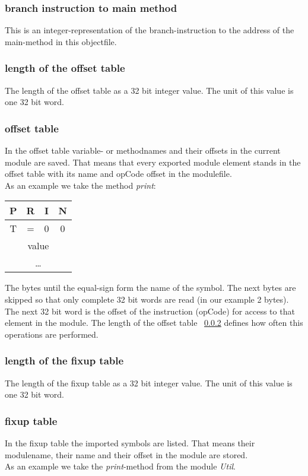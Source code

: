 \subsubsection{branch instruction to main method}
\label{branch_to_main}
This is an integer-representation of the branch-instruction to the address of
the main-method in this objectfile. 
\subsubsection{length of the offset table}
\label{length_offset_table}
The length of the offset table as a 32 bit integer value. The unit of this value
is one 32 bit word. 
\subsubsection{offset table}
\label{offset_table}
In the offset table variable- or methodnames and their offsets in the current
module are saved. That means that every exported module element stands in the
offset table with its name and opCode offset in the modulefile.  \\
As an example we take the method \emph{print}:

\begin{center}
	\begin{tabular}{|c|c|c|c|}
		\hline
		P &  R & I & N \\
		\hline
		T &  = &  0 & 0 \\
		\hline 
		\multicolumn{4}{|c|}{value} \\
		\hline
		\multicolumn{4}{|c|}{\ldots} \\
		\hline
	\end{tabular}
\end{center}

The bytes until the equal-sign form the name of the symbol. The next bytes
are skipped so that only complete 32 bit words are read (in our example 2 bytes). 
The next 32 bit word is the offset of the instruction (opCode) for access to that 
element in the module. The length of the offset table ~\ref{length_offset_table}  
defines how often this operations are performed. 

\subsubsection{length of the fixup table}
\label{length_fixup_table}
The length of the fixup table as a 32 bit integer value. The unit of this value
is one 32 bit word. 
\subsubsection{fixup table}
\label{fixup_table}
In the fixup table the imported symbols are listed. That means their modulename,
their name and their offset in the module are stored. \\
As an example we take the \emph{print}-method from the module \emph{Util}.

